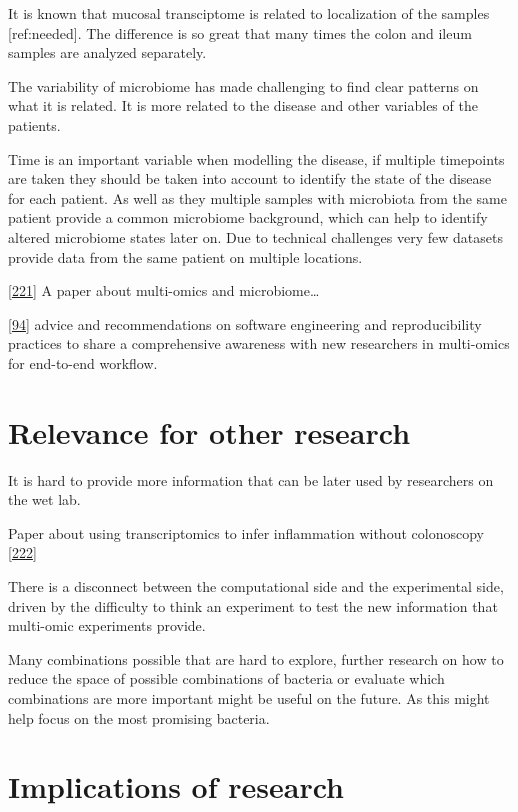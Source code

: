 \documentclass[
  a4paper,
]{book}
\begin{document}
It is known that mucosal transciptome is related to localization of the samples {[}ref:needed{]}.
The difference is so great that many times the colon and ileum samples are analyzed separately.

The variability of microbiome has made challenging to find clear patterns on what it is related.
It is more related to the disease and other variables of the patients.

Time is an important variable when modelling the disease, if multiple timepoints are taken they should be taken into account to identify the state of the disease for each patient.
As well as they multiple samples with microbiota from the same patient provide a common microbiome background, which can help to identify altered microbiome states later on.
Due to technical challenges very few datasets provide data from the same patient on multiple locations.

{[}\protect\hyperlink{ref-jiang2019}{221}{]} A paper about multi-omics and microbiome\ldots{}

{[}\protect\hyperlink{ref-krassowski2020}{94}{]} advice and recommendations on software engineering and reproducibility practices to share a comprehensive awareness with new researchers in multi-omics for end-to-end workflow.

\hypertarget{relevance-for-other-research}{%
\section{Relevance for other research}\label{relevance-for-other-research}}

It is hard to provide more information that can be later used by researchers on the wet lab.

Paper about using transcriptomics to infer inflammation without colonoscopy {[}\protect\hyperlink{ref-ungar2022}{222}{]}

There is a disconnect between the computational side and the experimental side, driven by the difficulty to think an experiment to test the new information that multi-omic experiments provide.

Many combinations possible that are hard to explore, further research on how to reduce the space of possible combinations of bacteria or evaluate which combinations are more important might be useful on the future.
As this might help focus on the most promising bacteria.

\hypertarget{implications-of-research}{%
\section{Implications of research}\label{implications-of-research}}
\end{document}
